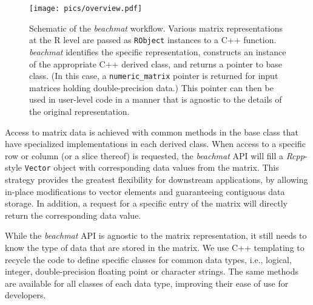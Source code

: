 \documentclass[10pt,letterpaper]{article}
\newcommand{\beachmat}{\textit{beachmat}}
\newcommand{\code}[1]{\texttt{#1}}
\begin{document}
\begin{figure}[btp]
    \begin{center}
        \texttt{[image: pics/overview.pdf]}
    \end{center}
    \caption{Schematic of the \beachmat{} workflow.
        Various matrix representations at the R level are passed as \code{RObject} instances to a C++ function.
        \beachmat{} identifies the specific representation, constructs an instance of the appropriate C++ derived class, and returns a pointer to base class.
        (In this case, a \code{numeric\_matrix} pointer is returned for input matrices holding double-precision data.)
        This pointer can then be used in user-level code in a manner that is agnostic to the details of the original representation.
    }
    \label{fig:beachoverview}
\end{figure}

Access to matrix data is achieved with common methods in the base class that have specialized implementations in each derived class. 
When access to a specific row or column (or a slice thereof) is requested, the \beachmat{} API will fill a \textit{Rcpp}-style \code{Vector} object with corresponding data values from the matrix.
This strategy provides the greatest flexibility for downstream applications, by allowing in-place modifications to vector elements and guaranteeing contiguous data storage. 
In addition, a request for a specific entry of the matrix will directly return the corresponding data value.

While the \beachmat{} API is agnostic to the matrix representation, it still needs to know the type of data that are stored in the matrix.
We use C++ templating to recycle the code to define specific classes for common data types, i.e., logical, integer, double-precision floating point or character strings.
The same methods are available for all classes of each data type, improving their ease of use for developers.
\end{document}
